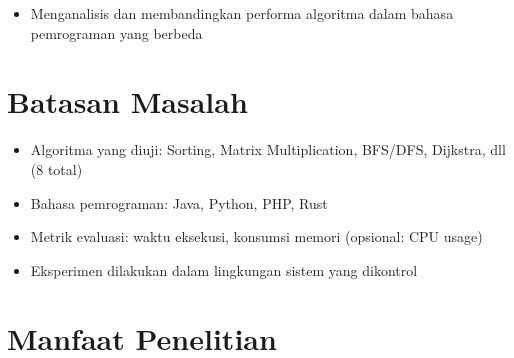 \begin{itemize}
	\item Menganalisis dan membandingkan performa algoritma dalam bahasa pemrograman yang berbeda
\end{itemize}

\section{Batasan Masalah}
\label{sec:batasanMasalah}

\begin{itemize}
	\item Algoritma yang diuji: Sorting, Matrix Multiplication, BFS/DFS, Dijkstra, dll (8 total)
	\item Bahasa pemrograman: Java, Python, PHP, Rust
	\item Metrik evaluasi: waktu eksekusi, konsumsi memori (opsional: CPU usage)
	\item Eksperimen dilakukan dalam lingkungan sistem yang dikontrol
\end{itemize}





\section{Manfaat Penelitian}
\label{sec:manfaat}


